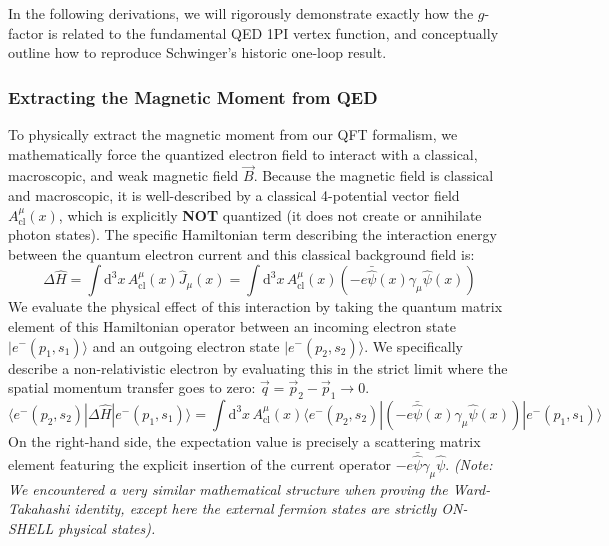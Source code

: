 In the following derivations, we will rigorously demonstrate exactly how the $g$-factor is related to the fundamental QED 1PI vertex function, and conceptually outline how to reproduce Schwinger's historic one-loop result.

\subsubsection{Extracting the Magnetic Moment from QED}

To physically extract the magnetic moment from our QFT formalism, we mathematically force the quantized electron field to interact with a classical, macroscopic, and weak magnetic field $\vec{B}$.
Because the magnetic field is classical and macroscopic, it is well-described by a classical 4-potential vector field $A^{\mu}_{\text{cl}}(x)$, which is explicitly \textbf{NOT} quantized (it does not create or annihilate photon states). The specific Hamiltonian term describing the interaction energy between the quantum electron current and this classical background field is:
\[
    \Delta \hat{H} = \int \mathrm{d}^3 x \, A^\mu_{\text{cl}}(x) \hat{J}_\mu(x) = \int \mathrm{d}^3 x \, A^\mu_{\text{cl}}(x) (-e \bar{\hat{\psi}}(x) \gamma_\mu \hat{\psi}(x))
\]
We evaluate the physical effect of this interaction by taking the quantum matrix element of this Hamiltonian operator between an incoming electron state $| e^-(p_1, s_1) \rangle$ and an outgoing electron state $| e^-(p_2, s_2) \rangle$. We specifically describe a non-relativistic electron by evaluating this in the strict limit where the spatial momentum transfer goes to zero: $\vec{q} = \vec{p}_2 - \vec{p}_1 \to 0$.
\[
    \langle e^-(p_2, s_2) | \Delta \hat{H} | e^-(p_1, s_1) \rangle = \int \mathrm{d}^3 x \, A^\mu_{\text{cl}}(x) \langle e^-(p_2, s_2) | (-e \bar{\hat{\psi}}(x) \gamma_\mu \hat{\psi}(x)) | e^-(p_1, s_1) \rangle
\]
On the right-hand side, the expectation value is precisely a scattering matrix element featuring the explicit insertion of the current operator $-e \bar{\hat{\psi}} \gamma_\mu \hat{\psi}$. \textit{(Note: We encountered a very similar mathematical structure when proving the Ward-Takahashi identity, except here the external fermion states are strictly ON-SHELL physical states).}

